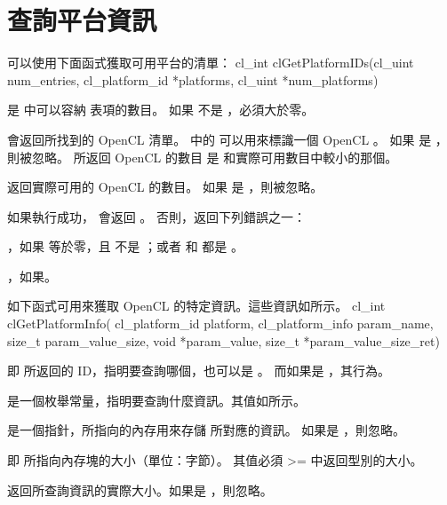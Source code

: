 \section{查詢平台資訊}
可以使用下面函式獲取可用平台的清單：
\startCLFUNC
cl_int clGetPlatformIDs(cl_uint num_entries,
			cl_platform_id *platforms,
			cl_uint *num_platforms)
\stopCLFUNC

 是  中可以容納  表項的數目。
如果  不是 ，必須大於零。

 會返回所找到的 OpenCL  清單。
 中的  可以用來標識一個 OpenCL 。
如果  是 ，則被忽略。
所返回 OpenCL  的數目 是  和實際可用數目中較小的那個。

 返回實際可用的 OpenCL  的數目。
如果  是 ，則被忽略。

如果執行成功， 會返回 。
否則，返回下列錯誤之一：
\startigBase
\item {}，如果  等於零，且  不是 ；或者  和  都是 。
\item {}，如果\schostfailres。
\stopigBase

如下函式可用來獲取 OpenCL 的特定資訊。這些資訊如所示。
\startCLFUNC
cl_int clGetPlatformInfo(
		cl_platform_id platform,
		cl_platform_info param_name,
		size_t param_value_size,
		void *param_value,
		size_t *param_value_size_ret)
\stopCLFUNC

 即  所返回的 ID，指明要查詢哪個，也可以是 。
而如果是 ，其行為。

 是一個枚舉常量，指明要查詢什麼資訊。其值如所示。

 是一個指針，所指向的內存用來存儲  所對應的資訊。
如果是 ，則忽略。

 即  所指向內存塊的大小（單位：字節）。
其值必須 >= 中返回型別的大小。

 返回所查詢資訊的實際大小。如果是 ，則忽略。

